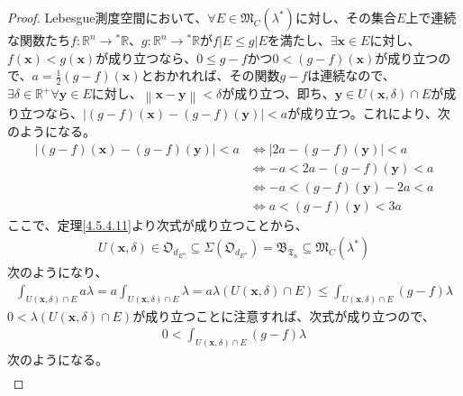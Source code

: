 \documentclass[dvipdfmx]{jsarticle}
\begin{document}
\begin{proof}
Lebesgue測度空間において、$\forall E \in \mathfrak{M}_{C}\left( \lambda^{*} \right)$に対し、その集合$E$上で連続な関数たち$f:\mathbb{R}^{n} \rightarrow{}^{*}\mathbb{R}$、$g:\mathbb{R}^{n} \rightarrow{}^{*}\mathbb{R}$が$f|E \leq g|E$を満たし、$\exists\mathbf{x} \in E$に対し、$f\left( \mathbf{x} \right) < g\left( \mathbf{x} \right)$が成り立つなら、$0 \leq g - f$かつ$0 < (g - f)\left( \mathbf{x} \right)$が成り立つので、$a = \frac{1}{2}(g - f)\left( \mathbf{x} \right)$とおかれれば、その関数$g - f$は連続なので、$\exists\delta \in \mathbb{R}^{+}\forall\mathbf{y} \in E$に対し、$\left\| \mathbf{x} - \mathbf{y} \right\| < \delta$が成り立つ、即ち、$\mathbf{y} \in U\left( \mathbf{x},\delta \right) \cap E$が成り立つなら、$\left| (g - f)\left( \mathbf{x} \right) - (g - f)\left( \mathbf{y} \right) \right| < a$が成り立つ。これにより、次のようになる。
\begin{align*}
\left| (g - f)\left( \mathbf{x} \right) - (g - f)\left( \mathbf{y} \right) \right| < a &\Leftrightarrow \left| 2a - (g - f)\left( \mathbf{y} \right) \right| < a\\
&\Leftrightarrow - a < 2a - (g - f)\left( \mathbf{y} \right) < a\\
&\Leftrightarrow - a < (g - f)\left( \mathbf{y} \right) - 2a < a\\
&\Leftrightarrow a < (g - f)\left( \mathbf{y} \right) < 3a
\end{align*}
ここで、定理\ref{4.5.4.11}より次式が成り立つことから、
\begin{align*}
U\left( \mathbf{x},\delta \right) \in \mathfrak{O}_{d_{E^{n}}} \subseteq \varSigma\left( \mathfrak{O}_{d_{E^{n}}} \right) = \mathfrak{B}_{\mathfrak{T}_{n}} \subseteq \mathfrak{M}_{C}\left( \lambda^{*} \right)
\end{align*}
次のようになり、
\begin{align*}
\int_{U\left( \mathbf{x},\delta \right) \cap E} {a\lambda} = a\int_{U\left( \mathbf{x},\delta \right) \cap E} \lambda = a\lambda\left( U\left( \mathbf{x},\delta \right) \cap E \right) \leq \int_{U\left( \mathbf{x},\delta \right) \cap E} {(g - f)\lambda}
\end{align*}
$0 < \lambda\left( U\left( \mathbf{x},\delta \right) \cap E \right)$が成り立つことに注意すれば、次式が成り立つので、
\begin{align*}
0 < \int_{U\left( \mathbf{x},\delta \right) \cap E} {(g - f)\lambda}
\end{align*}
次のようになる。
\begin{align*}

\end{align*}
\end{proof}
\end{document}
